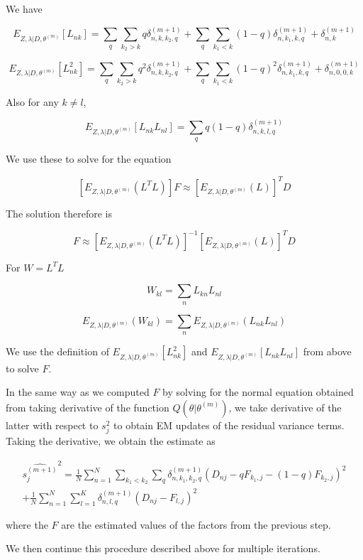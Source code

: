 \documentclass[11pt,authoryear]{article}
\begin{document}
We have 

$$ E_{ Z, \lambda | D, \theta^{(m)}} \left [ L_{nk} \right ] = \sum_{q}  \sum_{k_2 > k} q \delta^{(m+1)}_{n, k, k_2, q}  + \sum_{q}  \sum_{k_1 < k} (1-q) \delta^{(m+1)}_{n, k_1, k, q} +  \delta^{(m+1)}_{n, k} $$

$$ E_{ Z, \lambda | D, \theta^{(m)}} \left [ L^2_{nk} \right ] = \sum_{q}  \sum_{k_2 > k} q^2 \delta^{(m+1)}_{n,k,k_2, q}  + \sum_{q}  \sum_{k_1 < k} (1-q)^2 \delta^{(m+1)}_{n,k_1,k,q} +  \delta^{(m+1)}_{n, 0, 0, k} $$

Also for any $k \neq l$,

$$ E_{ Z, \lambda | D, \theta^{(m)}} \left [ L_{nk}L_{nl} \right ] =
\sum_{q} q(1-q) \delta^{(m+1)}_{n,k,l,q} $$

We use these to solve for the equation

$$ \left [ E_{ Z, \lambda | D, \theta^{(m)}} \left( L^{T}L \right ) \right ] F \approx \left [ E_{ Z, \lambda | D, \theta^{(m)}} (L) \right] ^{T} D $$

The solution therefore is 

$$ F \approx \left [ E_{ Z, \lambda | D, \theta^{(m)}} \left( L^{T}L \right ) \right]^{-1} \left [ E_{ Z, \lambda | D, \theta^{(m)}} (L) \right]^{T} D $$

For $W = L^{T}L$

$$ W_{kl} = \sum_{n} L_{kn}L_{nl} $$

$$ E_{ Z, \lambda | D, \theta^{(m)}} \left ( W_{kl} \right ) = \sum_{n}  E_{ Z, \lambda | D, \theta^{(m)}} \left ( L_{nk}L_{nl} \right) $$

We use the definition of $E_{ Z, \lambda | D, \theta^{(m)}} \left [ L^2_{nk} \right ]$ 
and $E_{ Z, \lambda | D, \theta^{(m)}} \left [ L_{nk}L_{nl} \right ]$ 
from above to solve $F$. 

In the same way as we computed $F$ by solving for the normal equation obtained from taking derivative of the function $Q (\theta | \theta^{(m)})$, we take derivative of the latter with respect to $s^2_{j}$ to obtain EM updates of the residual variance terms. Taking the derivative, we obtain the estimate as 

\begin{multline}
\widehat{s_{j}^{(m+1)}}^2 = \frac{1}{N}\sum_{n=1}^{N} \sum_{k_1 < k_2} \sum_{q} \delta^{(m+1)}_{n, k_1, k_2, q} (D_{nj} - q F_{k_1,j} - (1-q) F_{k_2,j})^2 \\
+  \frac{1}{N}\sum_{n=1}^{N} \sum_{l=1}^{K} \delta^{(m+1)}_{n, l, q} (D_{nj} - F_{l,j} )^2
\end{multline}

where the $F$ are the estimated values of the factors from the previous step.

We then continue this procedure described above for multiple iterations.
\end{document}
